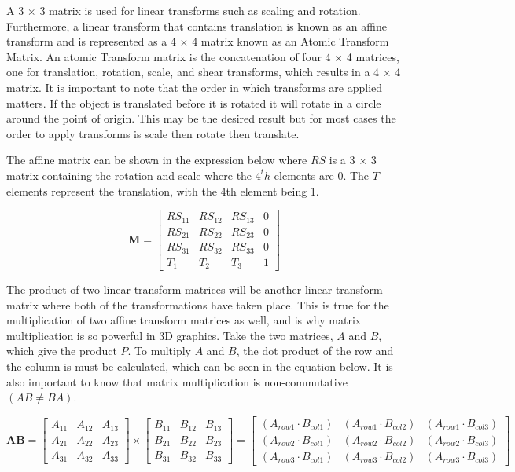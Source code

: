 \noindent
A 3 $\times$ 3 matrix is used for linear transforms such as scaling and rotation. Furthermore, a linear transform that contains translation is known as an affine transform and is represented as a 4 $\times$ 4 matrix known as an Atomic Transform Matrix. An atomic Transform matrix is the concatenation of four 4 $\times$ 4 matrices, one for translation, rotation, scale, and shear transforms, which results in a 4 $\times$ 4 matrix. It is important to note that the order in which transforms are applied matters. If the object is translated before it is rotated it will rotate in a circle around the point of origin. This may be the desired result but for most cases the order to apply transforms is scale then rotate then translate. 

The affine matrix can be shown in the expression below where $RS$ is a 3 $\times$ 3 matrix containing the rotation and scale where the $4^th$ elements are 0. The $T$ elements represent the translation, with the 4th element being 1. 

\begin{equation}
\textbf{M} = \begin{bmatrix}
RS_{11} & RS_{12} & RS_{13} & 0\\
RS_{21} & RS_{22} & RS_{23} & 0\\
RS_{31} & RS_{32} & RS_{33} & 0\\
T_{1} & T_{2} & T_{3} & 1
\end{bmatrix}
\end{equation}

\noindent
The product of two linear transform matrices will be another linear transform matrix where both of the transformations have taken place. This is true for the multiplication of two affine transform matrices as well, and is why matrix multiplication is so powerful in 3D graphics. Take the two matrices, $A$ and $B$, which give the product $P$. To multiply $A$ and $B$, the dot product of the row and the column is must be calculated, which can be seen in the equation below. It is also important to know that matrix multiplication is non-commutative $(AB \not= BA)$.

\begin{equation}
\textbf{AB} = \begin{bmatrix}
A_{11} & A_{12} & A_{13}\\
A_{21} & A_{22} & A_{23}\\
A_{31} & A_{32} & A_{33}
\end{bmatrix}
\times
\begin{bmatrix}
B_{11} & B_{12} & B_{13}\\
B_{21} & B_{22} & B_{23}\\
B_{31} & B_{32} & B_{33}
\end{bmatrix}
= \begin{bmatrix}
(A_{row1} \cdot B_{col1}) & (A_{row1} \cdot B_{col2}) & (A_{row1} \cdot B_{col3})\\
(A_{row2} \cdot B_{col1}) & (A_{row2} \cdot B_{col2}) & (A_{row2} \cdot B_{col3})\\
(A_{row3} \cdot B_{col1}) & (A_{row3} \cdot B_{col2}) & (A_{row3} \cdot B_{col3})
\end{bmatrix}
\end{equation}

